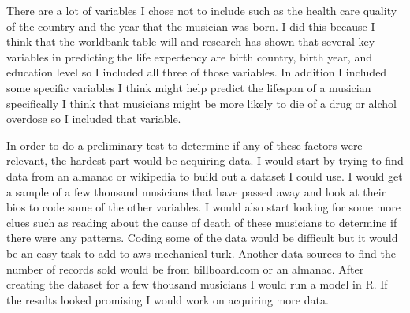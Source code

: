 \documentclass{article}
\begin{document}
There are a lot of variables I chose not to include such as the health care quality of the country and the year that the musician was born.  I did this because I think that the worldbank table will and research has shown that several key variables in predicting the life expectency are birth country, birth year, and education level so I included all three of those variables.  In addition I included some specific variables I think might help predict the lifespan of a musician specifically I think that musicians might be more likely to die of a drug or alchol overdose so I included that variable.  
\vspace{5mm}

In order to do a preliminary test to determine if any of these factors were relevant, the hardest part would be acquiring data.  I would start by trying to find data from an almanac or wikipedia to build out a dataset I could use.  I would get a sample of a few thousand musicians that have passed away and look at their bios to code some of the other variables.  I would also start looking for some more clues such as reading about the cause of death of these musicians to determine if there were any patterns.  Coding some of the data would be difficult but it would be an easy task to add to aws mechanical turk.  Another data sources to find the number of records sold would be from billboard.com or an almanac.  After creating the dataset for a few thousand musicians I would run a model in R.  If the results looked promising I would work on acquiring more data.
\end{document}
